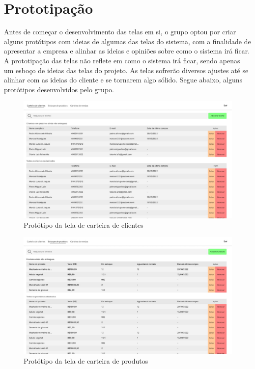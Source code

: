 \documentclass[serif, english, brazilian, oneside]{uffstex}
\begin{document}
\newpage

\section{Prototipação}

Antes de começar o desenvolvimento das telas em si, o grupo optou por criar alguns protótipos com ideias de algumas das telas do sistema, com a finalidade de apresentar a empresa e alinhar as ideias e opiniões sobre como o sistema irá ficar.
A prototipação das telas não reflete em como o sistema irá ficar, sendo apenas um esboço de ideias das telas do projeto. As telas sofrerão diversos ajustes até se alinhar com as ideias do cliente e se tornarem algo sólido.
Segue abaixo, alguns protótipos desenvolvidos pelo grupo.


\begin{figure}[!htpb]
    \centering
    \caption{Protótipo da tela de carteira de clientes}
    \label{fig:prototipo_carteira_clientes}
    \includegraphics[width=\linewidth]{imagens/prototipo_carteira_clientes.jpeg}
\end{figure}

\begin{figure}[!htpb]
    \centering
    \caption{Protótipo da tela de carteira de produtos}
    \label{fig:prototipo_carteira_produtos}
    \includegraphics[width=\linewidth]{imagens/prototipo_estoque_produtos.jpeg}
\end{figure}
\end{document}

